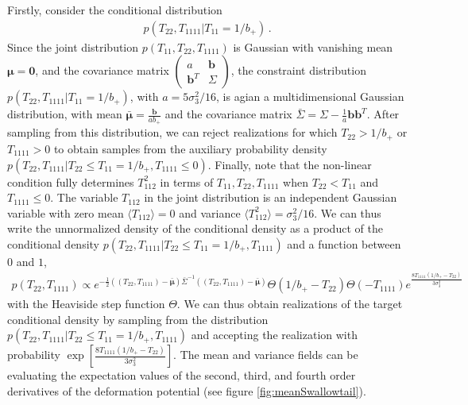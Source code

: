 \documentclass[a4paper, 11pt]{article}
\begin{document}
Firstly, consider the conditional distribution
\begin{align}
p(T_{22},T_{1111}|T_{11}=1/b_+)\,.
\end{align}
Since the joint distribution $p(T_{11},T_{22},T_{1111})$ is Gaussian with vanishing mean $\bm{\mu}=\bm{0}$, and the covariance matrix $\begin{pmatrix} a & \bm{b} \\ \bm{b}^T & \Sigma \end{pmatrix}$, the constraint distribution $p(T_{22},T_{1111}|T_{11}=1/b_+)$, with $a=5 \sigma_3^2/16$, is agian a multidimensional Gaussian distribution, with mean $\bar{\bm{\mu}}=\frac{\bm{b}}{a b_+}$ and the covariance matrix $\bar{\Sigma}=\Sigma -\frac{1}{a} \bm{b}\bm{b}^T$. After sampling from this distribution, we can reject realizations for which $T_{22}>1/b_+$ or $T_{1111}>0$ to obtain samples from the auxiliary probability density $p(T_{22},T_{1111}| T_{22} \leq T_{11}=1/b_+,T_{1111}\leq 0)$. Finally, note that the non-linear condition fully determines $T_{112}^2$ in terms of $T_{11},T_{22},T_{1111}$ when $T_{22} < T_{11}$ and $T_{1111}\leq 0$. The variable $T_{112}$ in the joint distribution is an independent Gaussian variable with zero mean $\langle T_{112}\rangle = 0$ and variance $\langle T_{112}^2\rangle = \sigma_3^2/16$. We can thus write the unnormalized density of the conditional density as a product of the conditional density $p(T_{22},T_{1111}|T_{22}\leq T_{11}=1/b_+,T_{1111})$ and a function between $0$ and $1$,
\begin{align}
p(T_{22},T_{1111}) \propto e^{-\frac{1}{2}((T_{22},T_{1111})-\bar{\bm{\mu}})\bar{\Sigma}^{-1}((T_{22},T_{1111})-\bar{\bm{\mu}}) }\Theta(1/b_+-T_{22})\Theta(-T_{1111})e^{ \frac{8T_{1111} (1/b_+ - T_{22})}{3 \sigma_3^2}}
\end{align}
with the Heaviside step function $\Theta$. We can thus obtain realizations of the target conditional density by sampling from the distribution $p(T_{22},T_{1111}|T_{22}\leq T_{11}=1/b_+,T_{1111})$ and accepting the realization with probability $\exp\left[ \frac{8T_{1111} (1/b_+ - T_{22})}{3 \sigma_3^2}\right]$. The mean and variance fields can be evaluating the expectation values of the second, third, and fourth order derivatives of the deformation potential (see figure \ref{fig:meanSwallowtail}).
\end{document}
